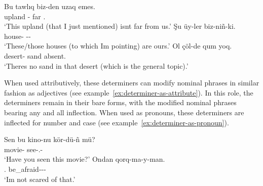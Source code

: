 \begin{lingexample}
	\ex \label{ex:proximal-determiner} \gll Bu tawlıq biz-den uzaq emes. \\
		\Prox{} upland \Fpl{}-\Abl{} far \Cop{}.\Neg{} \\
		\glt `This upland (that I just mentioned) isn\apostrophe{}t far from us.'
	\ex \label{ex:medial-determiner} \gll Şu üy-ler biz-niñ-ki. \\
		\Med{} house-\Pl{} \Fpl{}-\Gen{}-\Rel{} \\
		\glt `These/those houses (to which I\apostrophe{}m pointing) are ours.'
	\ex \label{ex:distal-determiner} \gll Ol çöl-de qum yoq. \\
		\Dist{} desert-\Loc{} sand absent. \\
		\glt `There\apostrophe{}s no sand in that desert (which is the general topic).'
\end{lingexample}

When used attributively, these determiners can modify nominal phrases in similar fashion as adjectives (see example~\ref{ex:determiner-as-attribute}).
In this role, the determiners remain in their bare forms, with the modified nominal phrases bearing any and all inflection.
When used as pronouns, these determiners are inflected for number and case (see example~\ref{ex:determiner-as-pronoun}).

\begin{lingexample}
	\ex \label{ex:determiner-as-attribute} \gll Sen bu kino-nu kör-dü-ñ mü? \\
		\Tsg{} \Prox{} movie-\Acc{} see-\Pst{}.\Def{}-\Tsg{} \Q{} \\
		\glt `Have you seen this movie?'
	\ex \label{ex:determiner-as-pronoun} \gll Ondan qorq-ma-y-man. \\
		\Dist{}.\Abl{} be\_afraid-\Neg{}-\Prs{}-\Fsg{} \\
		\glt `I\apostrophe{}m not scared of that.'
\end{lingexample}

